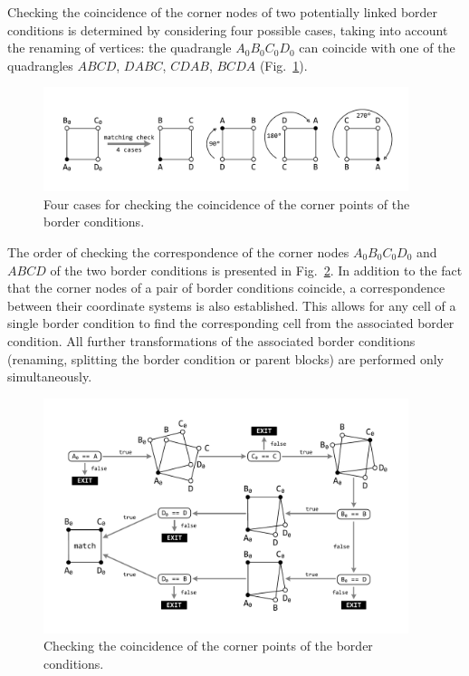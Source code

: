 \documentclass[
11pt,%
tightenlines,%
twoside,%
onecolumn,%
nofloats,%
nobibnotes,%
nofootinbib,%
superscriptaddress,%
noshowpacs,%
centertags]%
{revtex4}
\begin{document}
Checking the coincidence of the corner nodes of two potentially linked border conditions is determined by considering four possible cases, taking into account the renaming of vertices: the quadrangle $A_0B_0C_0D_0$ can coincide with one of the quadrangles $ABCD$, $DABC$, $CDAB$, $BCDA$ (Fig.~\ref{fig:match}).

\begin{figure}[h]
\setcaptionmargin{5mm}
\onelinecaptionstrue
\includegraphics[width=0.95\textwidth]{pics/match.pdf}
\caption{Four cases for checking the coincidence of the corner points of the border conditions.}
\label{fig:match}
\end{figure}

The order of checking the correspondence of the corner nodes $A_0B_0C_0D_0$ and $ABCD$ of the two border conditions is presented in Fig.~\ref{fig:match2}.
In addition to the fact that the corner nodes of a pair of border conditions coincide, a correspondence between their coordinate systems is also established.
This allows for any cell of a single border condition to find the corresponding cell from the associated border condition.
All further transformations of the associated border conditions (renaming, splitting the border condition or parent blocks) are performed only simultaneously.

\begin{figure}[h]
\setcaptionmargin{5mm}
\onelinecaptionstrue
\includegraphics[width=0.95\textwidth]{pics/match2.pdf}
\caption{Checking the coincidence of the corner points of the border conditions.}
\label{fig:match2}
\end{figure}
\end{document}
